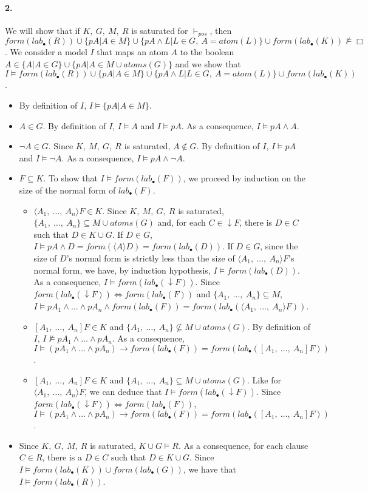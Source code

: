 \documentclass[a4paper,10pt]{report}
\newcommand{\atoms}{\mathit{atoms}}
\newcommand{\atom}{\mathit{atom}}
\newcommand{\pos}{\vdash_\mathit{pos}}
\newcommand{\F}{\mathit{form}}
\newcommand{\T}{\mathit{lab}}
\begin{document}
\paragraph{2.}
We will show that if $K,\ G,\ M,\ R$ is saturated for $\pos$, then
$\F(\T_\bullet(R))\cup\{pA|A\in M\}\cup\{pA\wedge L|L\in G,\ A=\atom(L)\}\cup
\F(\T_\bullet(K))\nvDash\Box$.
We consider a model $I$ that maps an atom $A$ to the boolean
$A\in\{A|A\in G\}\cup\{pA|A\in M\cup\atoms(G)\}$
and we show that $I\vDash\F(\T_\bullet(R))\cup\{pA|A\in M\}\cup\{pA\wedge L|L\in G,\ A=\atom(L)\}\cup
\F(\T_\bullet(K))$.
\begin{itemize}
 \item By definition of $I$, $I\vDash\{pA|A\in M\}$.
 \item $A\in G$. By definition of $I$, $I\vDash A$ and $I\vDash pA$. As a consequence, 
$I\vDash pA\wedge A$.
 \item $\neg A\in G$. Since $K,\ M,\ G,\ R$ is saturated, $A\notin G$. By definition of $I$,
$I\vDash pA$ and $I\vDash\neg A$. As a consequence, $I\vDash pA\wedge\neg A$.
 \item $F\subseteq K$. To show that $I\vDash\F(\T_\bullet(F))$, we proceed by induction on
the size of the normal form of $\T_\bullet(F)$.
\begin{itemize}
 \item $\langle A_1,\ \dots,\ A_n\rangle F\in K$. Since $K,\ M,\ G,\ R$ is saturated,
$\{A_1,\ \dots,\ A_n\}\subseteq M\cup\atoms(G)$ and, for each $C\in\downarrow F$, there is $D\in C$
such that $D\in K\cup G$. If $D\in G$, $I\vDash pA\wedge D=\F(\langle A\rangle D)=\F(\T_\bullet(D))$.
If $D\in G$, since the size of $D$'s normal form is strictly less than the size of
$\langle A_1,\ \dots,\ A_n\rangle F$'s normal form, we have, by induction hypothesis, 
$I\vDash\F(\T_\bullet(D))$. As a consequence, $I\vDash \F(\T_\bullet(\downarrow F))$.
Since $\F(\T_\bullet(\downarrow F))\Leftrightarrow\F(\T_\bullet(F))$ and 
$\{A_1,\ \dots,\ A_n\}\subseteq M$, $I\vDash pA_1\wedge\dots\wedge pA_n\wedge\F(\T_\bullet(F))=
\F(\T_\bullet(\langle A_1,\ \dots,\ A_n\rangle F))$.
 \item $[A_1,\ \dots,\ A_n]F\in K$ and $\{A_1,\ \dots,\ A_n\}\nsubseteq M\cup\atoms(G)$. 
By definition of $I$, $I\nvDash pA_1\wedge\dots\wedge pA_n$. As a consequence, $I\vDash(pA_1\wedge\dots\wedge pA_n)\rightarrow \F(\T_\bullet(F))=\F(\T_\bullet([A_1,\ \dots,\ A_n]F))$.
 \item $[A_1,\ \dots,\ A_n]F\in K$ and $\{A_1,\ \dots,\ A_n\}\subseteq M\cup\atoms(G)$.
Like for $\langle A_1,\ \dots,\ A_n\rangle F$, we can deduce that
$I\vDash\F(\T_\bullet(\downarrow F))$.
Since $\F(\T_\bullet(\downarrow F))\Leftrightarrow\F(\T_\bullet(F))$,
$I\vDash(pA_1\wedge\dots\wedge pA_n)\rightarrow \F(\T_\bullet(F))=\F(\T_\bullet([A_1,\ \dots,\ A_n]F))$.
\end{itemize}
\item Since $K,\ G,\ M,\ R$ is saturated, $K\cup G\vDash R$. As a consequence, for each clause $C\in R$,
there is a $D\in C$ such that $D\in K\cup G$. Since $I\vDash\F(\T_\bullet(K))\cup\F(\T_\bullet(G))$,
we have that $I\vDash\F(\T_\bullet(R))$.
\end{itemize}
\end{document}
